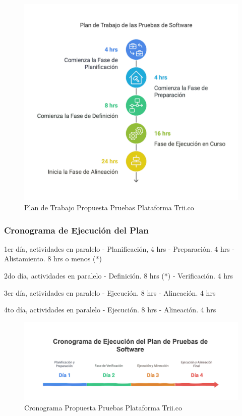 \documentclass[
  paper=a4,
  ,captions=tableheading
]{scrartcl}
\begin{document}
\begin{figure}
\centering
\includegraphics{images/plan.png}
\caption{Plan de Trabajo Propuesta Pruebas Plataforma
Trii.co}\label{fig:plan}
\end{figure}

\subsubsection{Cronograma de Ejecución del
Plan}\label{sec:cronograma-de-ejecuciuxf3n-del-plan}

1er día, actividades en paralelo - Planificación, 4 hrs - Preparación. 4
hrs - Alistamiento. 8 hrs o menos (*)

2do día, actividades en paralelo - Definición. 8 hrs (*) - Verificación.
4 hrs

3er día, actividades en paralelo - Ejecución. 8 hrs - Alineación. 4 hrs

4to día, actividades en paralelo - Ejecución. 8 hrs - Alineación. 4 hrs

\begin{figure}
\centering
\includegraphics{images/cronograma.png}
\caption{Cronograma Propuesta Pruebas Plataforma
Trii.co}\label{fig:cronograma}
\end{figure}
\end{document}
